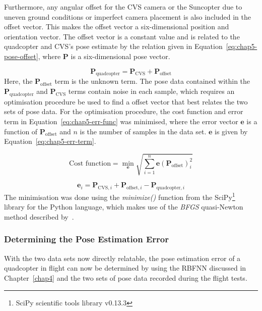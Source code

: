Furthermore, any angular offset for the CVS camera or the Suncopter due to uneven ground conditions or imperfect camera placement is also included in the offset vector. This makes the offset vector a six-dimensional position and orientation vector. The offset vector is a constant value and is related to the quadcopter and CVS's pose estimate by the relation given in Equation~\ref{eq:chap5-pose-offset}, where $\bm{P}$ is a six-dimensional pose vector. 

\begin{equation}
  \label{eq:chap5-pose-offset}
  \bm{P}_{\mathrm{quadcopter}} = \bm{P}_{\mathrm{CVS}} + \bm{P}_{\mathrm{offset}}
\end{equation}
Here, the $\bm{P}_{\mathrm{offset}}$ term is the unknown term. The pose data contained within the $\bm{P}_{\mathrm{quadcopter}}$ and $\bm{P}_{\mathrm{CVS}}$ terms contain noise in each sample, which requires an optimisation procedure be used to find a offset vector that best relates the two sets of pose data. For the optimisation procedure, the cost function and error term in Equation~\ref{eq:chap5-err-func} was minimised, where the error vector $\bm{e}$ is a function of $\bm{P}_{\mathrm{offset}}$ and $n$ is the number of samples in the data set. $\bm{e}$ is given by Equation~\ref{eq:chap5-err-term}. 

\begin{equation}
  \label{eq:chap5-err-func}
  \text{Cost function} = \min_{\bm{e}}\sqrt{\displaystyle\sum_{i=1}^{n} \bm{e}(\bm{P}_{\mathrm{offset}})_i^2}
\end{equation}

\begin{equation}
  \label{eq:chap5-err-term}
  \bm{e}_i = \bm{P}_{\mathrm{CVS}, i} + \bm{P}_{\mathrm{offset}, i} - \bm{P}_{\mathrm{quadcopter}, i}
\end{equation}
The minimisation was done using the \emph{minimize()} function from the SciPy\footnote{SciPy scientific tools library v0.13.3} library for the Python language, which makes use of the \emph{BFGS} quasi-Newton method described by~\cite{nocedal2006numerical}. 

\subsubsection{Determining the Pose Estimation Error}

With the two data sets now directly relatable, the pose estimation error of a quadcopter in flight can now be determined by using the RBFNN discussed in Chapter~\ref{chap4} and the two sets of pose data recorded during the flight tests.  

